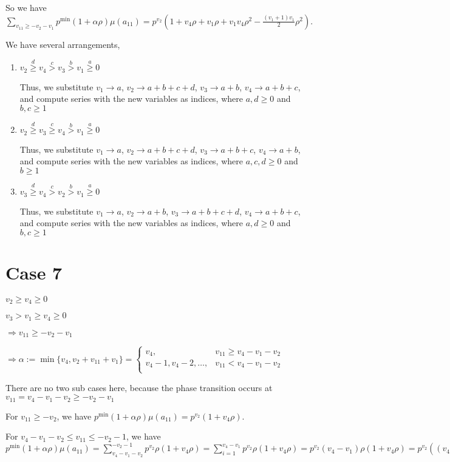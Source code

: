 \documentclass{article}
\begin{document}
So we have $\sum_{v_{11}\geq{-v_2-v_1}}p^{\min}(1+\alpha\rho)\mu(a_{11})=p^{v_2}(1+v_4\rho+v_1\rho+v_1v_4\rho^2-\frac{(v_1+1)v_1}{2}\rho^2).$

We have several arrangements,
\begin{enumerate}
    \item 
$v_2\overset{d}{\geq}v_4\overset{c}{>}v_3\overset{b}{>}{v_1}\overset{a}{\geq}{0}$

Thus, we substitute $v_1\rightarrow{a}$, $v_2\rightarrow{a+b+c+d}$, $v_3\rightarrow{a+b}$, $v_4\rightarrow{a+b+c}$, and compute series with the new variables as indices, where $a,d\geq{0}$ and $b,c\geq{1}$
    \item 
$v_2\overset{d}{\geq}v_3\overset{c}{\geq}v_4\overset{b}{>}{v_1}\overset{a}{\geq}{0}$

Thus, we substitute $v_1\rightarrow{a}$, $v_2\rightarrow{a+b+c+d}$, $v_3\rightarrow{a+b+c}$, $v_4\rightarrow{a+b}$, and compute series with the new variables as indices, where $a,c,d\geq{0}$ and $b\geq{1}$
    \item 
$v_3\overset{d}{\geq}v_4\overset{c}{>}v_2\overset{b}{>}{v_1}\overset{a}{\geq}{0}$

Thus, we substitute $v_1\rightarrow{a}$, $v_2\rightarrow{a+b}$, $v_3\rightarrow{a+b+c+d}$, $v_4\rightarrow{a+b+c}$, and compute series with the new variables as indices, where $a,d\geq{0}$ and $b,c\geq{1}$

\end{enumerate}
\section{Case 7}
$v_2\geq{v_4}\geq{0}$

$v_3>v_1\geq{v_4}\geq{0}$

$\Rightarrow{v_{11}}\geq{-v_2-v_1}$

$\Rightarrow\alpha:=\min\{v_4,v_2+v_{11}+v_1\}=\begin{cases}
       v_4, & v_{11}\geq{v_4-v_1-v_2}\\
       v_4-1,v_4-2,\dots, & v_{11}<{v_4-v_1-v_2}\\
     \end{cases}$

There are no two sub cases here, because the phase transition occurs at $v_{11}={v_4-v_1-v_2}\geq{-v_2-v_1}$

For $v_{11}\geq{-v_2}$, we have $p^{\min}(1+\alpha\rho)\mu(a_{11})=p^{v_2}(1+v_4\rho).$

For $v_4-v_1-v_2\leq{v_{11}}\leq{-v_2-1}$, we have $p^{\min}(1+\alpha\rho)\mu(a_{11})=\sum_{v_4-v_1-v_2}^{-v_2-1}p^{v_2}\rho(1+v_4\rho)=\sum_{i=1}^{v_4-v_1}p^{v_2}\rho(1+v_4\rho)=p^{v_2}(v_4-v_1)\rho(1+v_4\rho)=p^{v_2}((v_4-v_1)\rho+(v_4-v_1)v_4\rho^2).$
\end{document}

